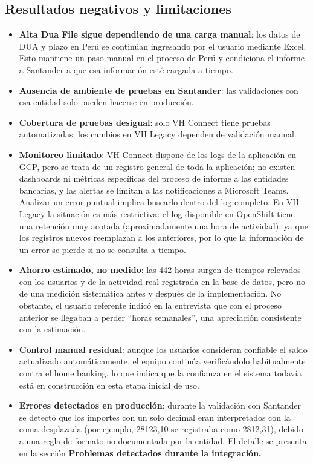 \subsection{Resultados negativos y limitaciones}

\begin{itemize}
\item
  \textbf{Alta Dua File sigue dependiendo de una carga manual}: los datos de DUA y plazo en Perú se continúan ingresando por el usuario mediante Excel. Esto mantiene un paso manual en el proceso de Perú y condiciona el informe a Santander a que esa información esté cargada a tiempo.
\item
  \textbf{Ausencia de ambiente de pruebas en Santander}: las validaciones con esa entidad solo pueden hacerse en producción.
\item
  \textbf{Cobertura de pruebas desigual}: solo VH Connect tiene pruebas automatizadas; los cambios en VH Legacy dependen de validación manual.
\item
  \textbf{Monitoreo limitado}: VH Connect dispone de los logs de la aplicación en GCP, pero se trata de un registro general de toda la aplicación; no existen dashboards ni métricas específicas del proceso de informe a las entidades bancarias, y las alertas se limitan a las notificaciones a Microsoft Teams. Analizar un error puntual implica buscarlo dentro del log completo. En VH Legacy la situación es más restrictiva: el log disponible en OpenShift tiene una retención muy acotada (aproximadamente una hora de actividad), ya que los registros nuevos reemplazan a los anteriores, por lo que la información de un error se pierde si no se consulta a tiempo.
\item
  \textbf{Ahorro estimado, no medido}: las 442 horas surgen de tiempos relevados con los usuarios y de la actividad real registrada en la base de datos, pero no de una medición sistemática antes y después de la implementación. No obstante, el usuario referente indicó en la entrevista que con el proceso anterior se llegaban a perder ``horas semanales'', una apreciación consistente con la estimación.
\item
  \textbf{Control manual residual}: aunque los usuarios consideran confiable el saldo actualizado automáticamente, el equipo continúa verificándolo habitualmente contra el home banking, lo que indica que la confianza en el sistema todavía está en construcción en esta etapa inicial de uso.
\item
  \textbf{Errores detectados en producción}: durante la validación con Santander se detectó que los importes con un solo decimal eran interpretados con la coma desplazada (por ejemplo, 28123,10 se registraba como 2812,31), debido a una regla de formato no documentada por la entidad. El detalle se presenta en la sección \textbf{Problemas detectados durante la integración.}
\end{itemize}

